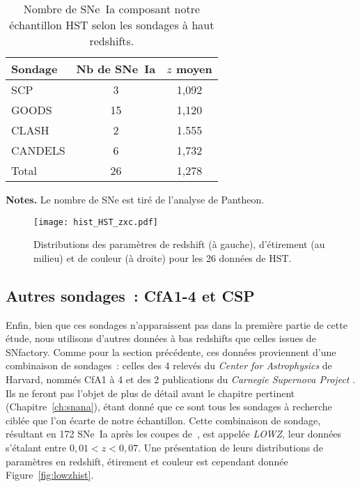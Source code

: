 \documentclass[../main/main.tex]{subfiles}
\begin{document}
\begin{table}[]
    \centering
    \begin{threeparttable}
        \caption{Nombre de SNe~Ia composant notre échantillon HST selon les
        sondages à haut redshifts.}
        \label{tab:hstcuts}
        \begin{tabular}{lcc}
            \toprule
            Sondage & Nb de SNe~Ia & $z$ moyen \\
            \midrule
            SCP     & 3            & 1,092 \\
            GOODS   & 15           & 1,120 \\
            CLASH   & 2            & 1.555 \\
            CANDELS & 6            & 1,732 \\
            \midrule
            Total   & 26           & 1,278 \\
            \bottomrule
        \end{tabular}
        \begin{tablenotes}[flushleft]
        \item \textbf{\hspace{-3,2pt}Notes.} Le nombre de SNe est tiré de
            l'analyse de Pantheon.
        \end{tablenotes}
    \end{threeparttable}
\end{table}

\begin{figure}[]
    \centering
    \texttt{[image: hist\_HST\_zxc.pdf]}
    \captionsetup{justification=centering}
    \caption{Distributions des paramètres de redshift (à gauche), d'étirement (au
    milieu) et de couleur (à droite) pour les 26 données de HST.}
    \label{fig:hsthist}
\end{figure}

\subsection{Autres sondages~: CfA1-4 et CSP}\label{ssec:lowz}

Enfin, bien que ces sondages n'apparaissent pas dans la première partie de cette
étude, nous utilisons d'autres données à bas redshifts que celles issues de
SNfactory. Comme pour la section précédente, ces données proviennent d'une
combinaison de sondages~: celles des 4 relevés du \textit{Center for
Astrophysics} de Harvard, nommés CfA1 à 4 \citep{riess1999, jha2006,
hicken2009a, hicken2009b, hicken2012} et des 2 publications du \textit{Carnegie
Supernova Project} \citep[CSP,][]{contreras2010, folatelli2010,
stritzinger2011}. Ils ne feront pas l'objet de plus de détail avant le chapitre
pertinent (Chapitre~\ref{ch:snana}), étant donné que ce sont tous les sondages à
recherche ciblée que l'on écarte de notre échantillon. Cette combinaison de
sondage, résultant en 172 SNe~Ia après les coupes de~\cite{scolnic2018}, est
appelée \textit{LOWZ}, leur données s'étalant entre $0,01 < z < 0,07$. Une
présentation de leurs distributions de paramètres en redshift, étirement et
couleur est cependant donnée Figure~\ref{fig:lowzhist}.
\end{document}
